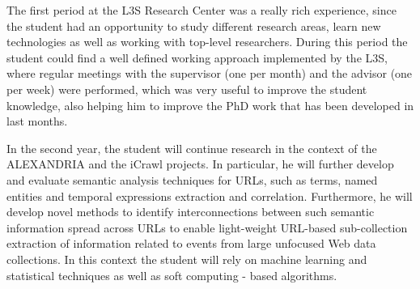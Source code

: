 \documentclass[a4paper,11pt]{report}
\begin{document}
The first period at the L3S Research Center was a really rich experience, since the student had
an opportunity to study different research areas, learn new technologies as
well as working with top-level researchers.
%
During this period the student could find a well defined working approach
implemented by the L3S, where regular meetings with the supervisor (one per month)
and the advisor (one per week) were performed, which was very useful to
improve the student knowledge, also helping him to improve the PhD work that has
been developed in last months. 
%

In the second year, the student will continue research in the context of the ALEXANDRIA 
and the iCrawl projects. In particular, he will further develop and evaluate semantic analysis 
techniques for URLs, such as terms, named entities and 
temporal expressions extraction and correlation. Furthermore, he will develop novel methods to identify
interconnections between such semantic information spread across URLs
to enable light-weight URL-based sub-collection extraction of information related to events
from large unfocused Web data collections.
In this context the student will rely on machine learning and 
statistical techniques as well as soft computing - based algorithms. 

\onehalfspace
{}

\end{document}
